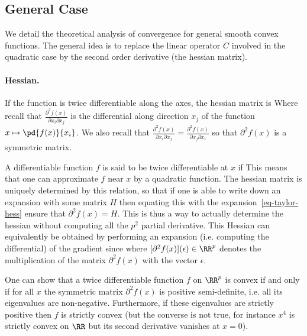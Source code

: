 \subsection{General Case}

We detail the theoretical analysis of convergence for general smooth convex functions. 
%
The general idea is to replace the linear operator $C$ involved in the quadratic case by the second order derivative (the hessian matrix).  

\paragraph{Hessian.}

If the function is twice differentiable along the axes, the hessian matrix is 
Where recall that $\frac{\partial^2 f(x)}{\partial x_i \partial x_j}$ is the differential along direction $x_j$ of the function $x \mapsto \pd{f(x)}{x_i}$. We also recall that $\frac{\partial^2 f(x)}{\partial x_i \partial x_j} = \frac{\partial^2 f(x)}{\partial x_j \partial x_i}$ so that $\partial^2 f(x)$ is a symmetric matrix.

A differentiable function $f$ is said to be twice differentiable at $x$ if
This means that one can approximate $f$ near $x$ by a quadratic function. 
%
The hessian matrix is uniquely determined by this relation, so that if one is able to write down an expansion with some matrix $H$
then equating this with the expansion~\eqref{eq-taylor-hess} ensure that $\partial^2 f(x)=H$. This is thus a way to actually determine the hessian without computing all the $p^2$ partial derivative.
%
This Hessian can equivalently be obtained by performing an expansion (i.e. computing the differential) of the gradient since
where $[\partial^2 f(x)](\epsilon) \in \RR^p$ denotes the multiplication of the matrix $\partial^2 f(x)$ with the vector $\epsilon$. 

One can show that a twice differentiable function $f$ on $\RR^p$ is convex if and only if for all $x$ the symmetric matrix $\partial^2 f(x)$ is positive semi-definite, i.e. all its eigenvalues are non-negative. 
% 
Furthermore, if these eigenvalues are strictly positive then $f$ is strictly convex (but the converse is not true, for instance $x^4$ is strictly convex on $\RR$ but its second derivative vanishes at $x=0$). 

